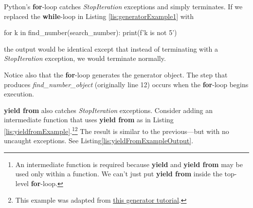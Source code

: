 Python's \textbf{for}-loop catches \textit{StopIteration} exceptions and simply terminates. If we replaced the \textbf{while}-loop in Listing \ref{lis:generatorExample1} with 
\begin{python}
for k in find_number(search_number):
    print(f'{k} is not 5')
\end{python}
the output would be identical except that instead of terminating with a \textit{StopIteration} exception, we would terminate normally.

Notice also that the \textbf{for}-loop generates the generator object. The step that produces \textit{find\_number\_object} (originally line 12) occurs when the  \textbf{for}-loop begins execution.

\smallv
\textbf{yield from} also catches \textit{StopIteration} exceptions. Consider adding an intermediate function that uses \textbf{yield from} as in Listing \ref{lis:yieldfromExample}.\footnote{An intermediate function is required because \textbf{yield} and \textbf{yield from} may be used only within a function. We can't just put \textbf{yield from} inside the top-level \textbf{for}-loop.}\footnote{This example was adapted from \href{https://www.python-course.eu/python3_generators.php}{\underline{this generator tutorial}}.} The result is similar to the previous---but with no uncaught exceptions. See Listing\ref{lis:yieldFromExampleOutput}. 




